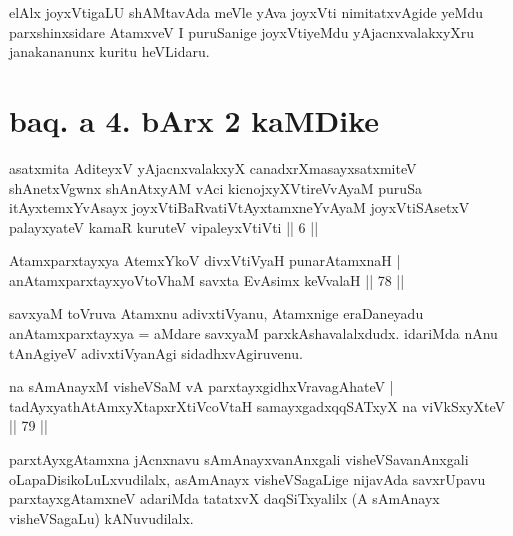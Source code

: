\begin{artha}
elAlx joyxVtigaLU shAMtavAda meVle yAva joyxVti nimitatxvAgide yeMdu parxshinxsidare AtamxveV I puruSanige joyxVtiyeMdu yAjacnxvalakxyXru janakananunx kuritu heVLidaru.
\end{artha}

\section*{baq. a 4. bArx 2 kaMDike}

\begin{shl}
asatxmita AditeyxV yAjacnxvalakxyX canadxrXmasayxsatxmiteV shAnetxV\s gwnx shAnAtxyAM vAci kicnojxyXVtireVvAyaM puruSa itAyxtemxYvAsayx joyxVtiBaRvatiVtAyxtamxneYvAyaM joyxVtiSAsetxV palayxyateV kamaR kuruteV vipaleyxVtiVti || 6 ||
\end{shl}


\begin{shl}
Atamx\footnotemark[1]{}parxtayxya AtemxYkoV divxVtiVyaH punarAtamxnaH | \\
anAtamxparxtayxyoV\s toV\s haM savxta EvAsimx keVvalaH \hfill||  78 ||  
\end{shl}

\begin{artha}
savxyaM toVruva Atamxnu adivxtiVyanu, Atamxnige eraDaneyadu anAtamxparxtayxya =  aMdare savxyaM parxkAshavalalxdudx. idariMda nAnu tAnAgiyeV adivxtiVyanAgi sidadhxvAgiruvenu.
\end{artha}


\begin{shl}
na sAmAnayxM visheVSaM vA parxtayxgidhxVravagAhateV | \\
tadAyxyathAtAmxyXtapxrXtiVcoV\s taH samayxgadxqqSATxyX na viVkSxyXteV \hfill||  79 ||  
\end{shl}

\begin{artha}
parxtAyxgAtamxna jAcnxnavu sAmAnayxvanAnxgali visheVSavanAnxgali oLapaDisikoLuLxvudilalx, asAmAnayx visheVSagaLige nijavAda savxrUpavu parxtayxgAtamxneV adariMda tatatxvX daqSiTxyalilx (A sAmAnayx visheVSagaLu) kANuvudilalx.
\end{artha}

